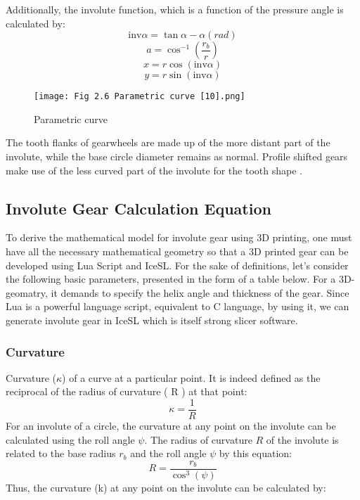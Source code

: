 \documentclass{article}
\begin{document}
Additionally, the involute function, which is a function of the pressure angle is calculated by:
\begin{equation}
    \mathrm{inv}\alpha=\tan{\alpha}-\alpha(rad)
\end{equation}
\begin{equation}
    a = \cos^{-1}\left(\frac{r_b}{r}\right)
\end{equation}
\begin{equation}
    x = r \cos(\text{inv}\alpha)
\end{equation}
\begin{equation}
    y = r \sin(\text{inv}\alpha)
\end{equation}

\begin{figure} [h]
    \centering
    \texttt{[image: Fig 2.6 Parametric curve [10].png]}
    \caption{Parametric curve \cite{ChadGlinsky10}}
    \label{fig:enter-label}
\end{figure}

The tooth flanks of gearwheels are made up of the more distant part of the involute, while the base circle diameter remains as normal. Profile shifted gears make use of the less curved part of the involute for the tooth shape \cite{Construction-and-design-of-involute-gears1}.
\subsection{Involute Gear Calculation Equation}
To derive the mathematical model for involute gear using 3D printing, one must have all the necessary mathematical geometry so that a 3D printed gear can be developed using Lua Script and IceSL. For the sake of definitions, let's consider the following basic parameters, presented in the form of a table below. For a 3D-geomatry, it demands to specify the helix angle and thickness of the gear. Since Lua is a powerful language script, equivalent to C language, by using it, we can generate involute gear in IceSL which is itself strong slicer software.
\subsubsection{Curvature}
Curvature ($\kappa$) of a curve at a particular point. It is indeed defined as the reciprocal of the radius of curvature ( R ) at that point:
\begin{equation}
    \kappa=\frac{1}{R}
\end{equation}
For an involute of a circle, the curvature at any point on the involute can be calculated using the roll angle \( \psi \). The radius of curvature \( R \) of the involute is related to the base radius \( r_b \) and the roll angle \( \psi \) by this equation:
\begin{equation}
    R = \frac{r_b}{{\cos}^3(\psi)}
\end{equation}
Thus, the curvature (k) at any point on the involute can be calculated by:
\end{document}
